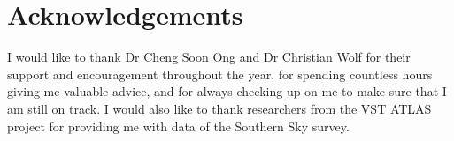 
\chapter*{Acknowledgements}
\label{cha:ack}

I would like to thank Dr Cheng Soon Ong and Dr Christian Wolf for their support and encouragement
throughout the year, for spending countless hours giving me valuable advice,
and for always checking up on me to make sure that I am still on track.
I would also like to thank researchers from the VST ATLAS project for providing me with
data of the Southern Sky survey.



